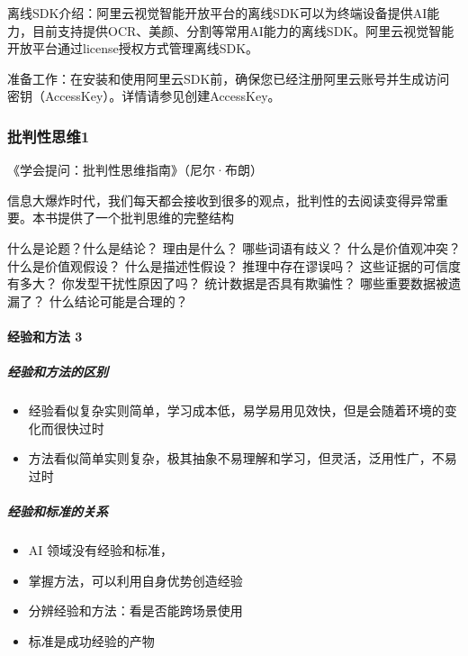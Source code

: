 \documentclass[letterpaper,10pt,english]{sphinxmanual}
\begin{document}
离线SDK介绍：阿里云视觉智能开放平台的离线SDK可以为终端设备提供AI能力，目前支持提供OCR、美颜、分割等常用AI能力的离线SDK。阿里云视觉智能开放平台通过license授权方式管理离线SDK。

准备工作：在安装和使用阿里云SDK前，确保您已经注册阿里云账号并生成访问密钥（AccessKey）。详情请参见创建AccessKey。


\subsubsection{批判性思维1\sphinxfootnotemark[419]}
\label{\detokenize{chapter_idea/critical:id1}}\label{\detokenize{chapter_idea/critical::doc}}%
\begin{footnotetext}[419]\sphinxAtStartFootnote
{}
%
\end{footnotetext}\ignorespaces 
《学会提问：批判性思维指南》（尼尔·布朗）

信息大爆炸时代，我们每天都会接收到很多的观点，批判性的去阅读变得异常重要。本书提供了一个批判思维的完整结构

什么是论题？什么是结论？ 理由是什么？ 哪些词语有歧义？
什么是价值观冲突？什么是价值观假设？ 什么是描述性假设？
推理中存在谬误吗？ 这些证据的可信度有多大？ 你发型干扰性原因了吗？
统计数据是否具有欺骗性？ 哪些重要数据被遗漏了？ 什么结论可能是合理的？


\paragraph{经验和方法 3\sphinxfootnotemark[420]}
\label{\detokenize{chapter_idea/critical:id2}}%
\begin{footnotetext}[420]\sphinxAtStartFootnote
{}
%
\end{footnotetext}\ignorespaces 

\subparagraph{经验和方法的区别}
\label{\detokenize{chapter_idea/critical:id3}}\begin{itemize}
\item {} 
经验看似复杂实则简单，学习成本低，易学易用见效快，但是会随着环境的变化而很快过时

\item {} 
方法看似简单实则复杂，极其抽象不易理解和学习，但灵活，泛用性广，不易过时

\end{itemize}


\subparagraph{经验和标准的关系}
\label{\detokenize{chapter_idea/critical:id4}}\begin{itemize}
\item {} 
AI 领域没有经验和标准，

\item {} 
掌握方法，可以利用自身优势创造经验

\item {} 
分辨经验和方法：看是否能跨场景使用

\item {} 
标准是成功经验的产物

\end{itemize}
\end{document}
